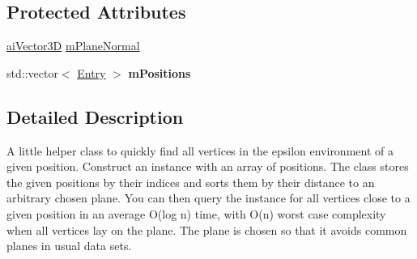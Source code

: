 \subsection*{Protected Attributes}
\begin{DoxyCompactItemize}
\item 
\hyperlink{structai_vector3_d}{ai\+Vector3\+D} \hyperlink{class_assimp_1_1_spatial_sort_ac74b71cbd72f9868e5cd273b13a92244}{m\+Plane\+Normal}
\item 
\hypertarget{class_assimp_1_1_spatial_sort_a64c6051c20d31e1cf0482bc83168eb4b}{std\+::vector$<$ \hyperlink{struct_assimp_1_1_spatial_sort_1_1_entry}{Entry} $>$ {\bfseries m\+Positions}}\label{class_assimp_1_1_spatial_sort_a64c6051c20d31e1cf0482bc83168eb4b}

\end{DoxyCompactItemize}


\subsection{Detailed Description}
A little helper class to quickly find all vertices in the epsilon environment of a given position. Construct an instance with an array of positions. The class stores the given positions by their indices and sorts them by their distance to an arbitrary chosen plane. You can then query the instance for all vertices close to a given position in an average O(log n) time, with O(n) worst case complexity when all vertices lay on the plane. The plane is chosen so that it avoids common planes in usual data sets. 

